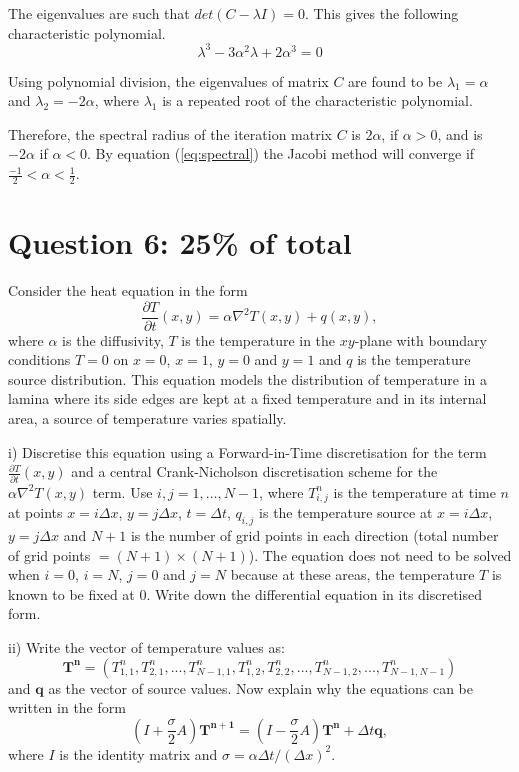 \documentclass[12pt]{article}
\def\MM#1{\boldsymbol{#1}}
\begin{document}
The eigenvalues are such that $det(C- \lambda I)=0$. This gives the following characteristic polynomial.
$$\lambda^3 - 3\alpha^2 \lambda + 2 \alpha^3=0$$

Using polynomial division, the eigenvalues of matrix $C$ are found to be $\lambda_1 = \alpha$ and $\lambda_2 = -2\alpha$, where $\lambda_1$ is a repeated root of the characteristic polynomial.

Therefore, the spectral radius of the iteration matrix $C$ is $2\alpha$, if $ \alpha > 0$, and is $ - 2\alpha$ if $\alpha<0$. By equation (\ref{eq:spectral}) the Jacobi method will converge if $\frac{-1}{2}< \alpha < \frac{1}{2}$.


\newpage
\section*{Question 6: 25\% of total}
Consider the heat equation in the form
\begin{equation}
\label{eq:heat}
\frac{\partial T}{\partial t}(x,y) = \alpha \nabla^2T(x,y)+q(x,y),
\end{equation}
where $\alpha$ is the diffusivity, $T$ is the temperature in the $xy$-plane with boundary conditions $T=0$ on $x=0$, $x=1$, $y=0$ and $y=1$ and $q$ is the temperature source distribution. This equation models the distribution of temperature in a lamina where its side edges are kept at a fixed temperature and in its internal area, a source of temperature varies spatially.

i) Discretise this equation using a Forward-in-Time discretisation for the term $\frac{\partial T}{\partial t}(x,y)$ and a central Crank-Nicholson discretisation scheme for the $\alpha \nabla^2T(x,y)$ term. Use $i,j=1,..., N-1$, where $T_{i,j}^n$ is the temperature at time $n$ at points $x = i\Delta x$, $y=j\Delta x$, $t=\Delta t$, $q_{i,j}$ is the temperature source at $x=i\Delta x$, $y = j\Delta x$ and $N+1$ is the number of grid points in each direction (total number of grid points $= (N+1) \times (N+1)$). The equation does not need to be solved when $i=0$, $i=N$, $j=0$ and $j=N$ because at these areas, the temperature $T$ is known to be fixed at 0. Write down the differential equation in its discretised form.

ii) Write the vector of temperature values as:
\begin{equation}
\label{eq:vector}
\MM{T^n} = (T_{1,1}^n, T_{2,1}^n, ..., T_{N-1,1}^n, T_{1,2}^n, T_{2,2}^n, ..., T_{N-1,2}^n, ..., T_{N-1,N-1}^n)
\end{equation}
and $\MM{q}$ as the vector of source values. Now explain why the equations can be written in the form
\begin{equation}
\label{eq:system}
\left(I+\frac{\sigma}{2}A \right)\MM{T^{n+1}} = \left(I-\frac{\sigma}{2}A \right)\MM{T^{n}}+\Delta t \MM{q},
\end{equation}
where $I$ is the identity matrix and $\sigma=\alpha \Delta t/(\Delta x)^2$.
\end{document}
